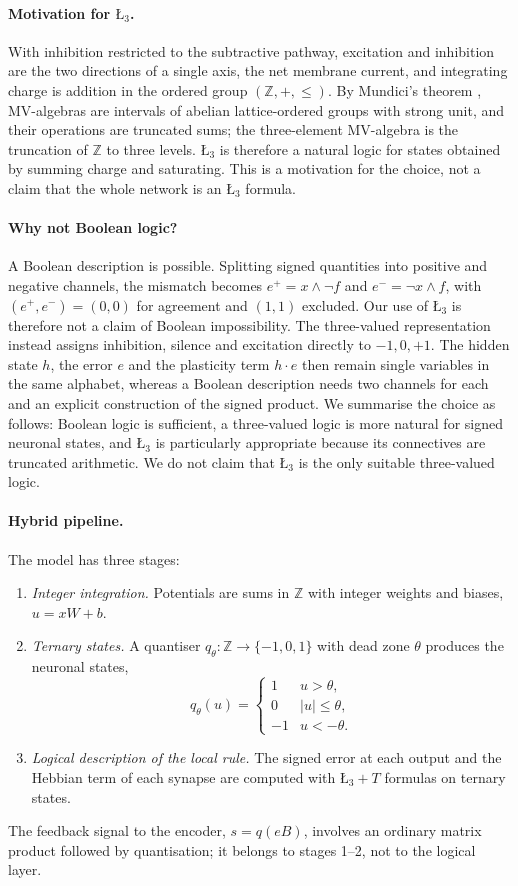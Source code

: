 \documentclass[11pt,a4paper]{article}
\theoremstyle{remark}
\newcommand{\Lt}{\text{\L}_3}
\newcommand{\LtT}{\text{\L}_3{+}T}
\newcommand{\Z}{\mathbb{Z}}
\begin{document}
\paragraph{Motivation for $\Lt$.} With inhibition restricted to the subtractive pathway, excitation and inhibition are the two directions of a single axis, the net membrane current, and integrating charge is addition in the ordered group $(\Z,+,\le)$. By Mundici's theorem \cite{mundici1986}, MV-algebras are intervals of abelian lattice-ordered groups with strong unit, and their operations are truncated sums; the three-element MV-algebra is the truncation of $\Z$ to three levels. $\Lt$ is therefore a natural logic for states obtained by summing charge and saturating. This is a motivation for the choice, not a claim that the whole network is an $\Lt$ formula.

\paragraph{Why not Boolean logic?} A Boolean description is possible. Splitting signed quantities into positive and negative channels, the mismatch becomes $e^+=x\land\neg f$ and $e^-=\neg x\land f$, with $(e^+,e^-)=(0,0)$ for agreement and $(1,1)$ excluded. Our use of $\Lt$ is therefore not a claim of Boolean impossibility. The three-valued representation instead assigns inhibition, silence and excitation directly to $-1,0,+1$. The hidden state $h$, the error $e$ and the plasticity term $h\cdot e$ then remain single variables in the same alphabet, whereas a Boolean description needs two channels for each and an explicit construction of the signed product. We summarise the choice as follows: Boolean logic is sufficient, a three-valued logic is more natural for signed neuronal states, and $\Lt$ is particularly appropriate because its connectives are truncated arithmetic. We do not claim that $\Lt$ is the only suitable three-valued logic.

\paragraph{Hybrid pipeline.} The model has three stages:
\begin{enumerate}
\item \emph{Integer integration.} Potentials are sums in $\Z$ with integer weights and biases, $u = xW + b$.
\item \emph{Ternary states.} A quantiser $q_\theta:\Z\to\{-1,0,1\}$ with dead zone $\theta$ produces the neuronal states,
\[
q_\theta(u)=\begin{cases}1 & u>\theta,\\ 0 & |u|\le\theta,\\ -1 & u<-\theta.\end{cases}
\]
\item \emph{Logical description of the local rule.} The signed error at each output and the Hebbian term of each synapse are computed with $\LtT$ formulas on ternary states.
\end{enumerate}
The feedback signal to the encoder, $s=q(eB)$, involves an ordinary matrix product followed by quantisation; it belongs to stages 1--2, not to the logical layer.
\end{document}
